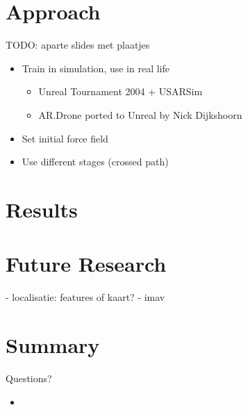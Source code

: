 \documentclass[10pt]{beamer}
\begin{document}
\section{Approach}
\begin{frame}
 TODO: aparte slides met plaatjes
 \begin{itemize}
   \item Train in simulation, use in real life
   \begin{itemize}
     \item Unreal Tournament 2004 + USARSim
     \item AR.Drone ported to Unreal by Nick Dijkshoorn
   \end{itemize}
   \item Set initial force field
   \item Use different stages (crossed path)
 \end{itemize}
\end{frame}

\section{Results}
\begin{frame}
\end{frame}

\section{Future Research}
\begin{frame}
 - localisatie: features of kaart?
 - imav
\end{frame}

\section{Summary}
\begin{frame}
\begin{block}{Questions?}
\begin{itemize}
  \item 

\end{itemize}
\end{block}
\end{frame}
\end{document}
